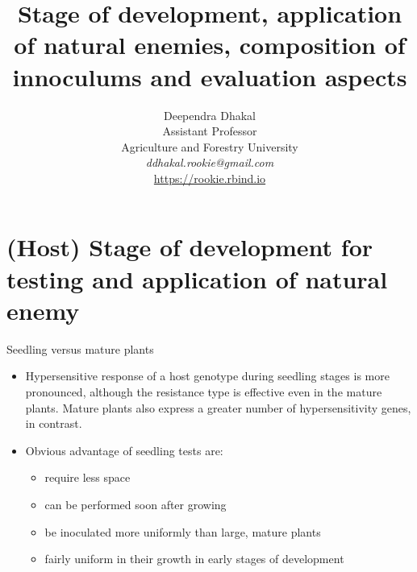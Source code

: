\documentclass[11pt,dvipsnames,ignorenonframetext,aspectratio=169]{beamer}
\title[]{Stage of development, application of natural enemies,
composition of innoculums and evaluation aspects}
\author[
        \vspace{-0.5cm}Deependra Dhakal\\
Assistant Professor\\
Agriculture and Forestry University\\
\textit{ddhakal.rookie@gmail.com}\\
\url{https://rookie.rbind.io}
    ]{\vspace{-0.5cm}Deependra Dhakal\\
Assistant Professor\\
Agriculture and Forestry University\\
\textit{ddhakal.rookie@gmail.com}\\
\url{https://rookie.rbind.io}}
\date[
      
  ]{
    }
\providecommand{\tightlist}{%
  \setlength{\itemsep}{0pt}\setlength{\parskip}{0pt}}
\begin{document}
  \begin{frame}[plain]
  \titlepage
  \end{frame}



\hypertarget{host-stage-of-development-for-testing-and-application-of-natural-enemy}{%
\section{(Host) Stage of development for testing and application of
natural
enemy}\label{host-stage-of-development-for-testing-and-application-of-natural-enemy}}

\begin{frame}{Seedling versus mature plants}
\protect\hypertarget{seedling-versus-mature-plants}{}
\begin{itemize}
\tightlist
\item
  Hypersensitive response of a host genotype during seedling stages is
  more pronounced, although the resistance type is effective even in the
  mature plants. Mature plants also express a greater number of
  hypersensitivity genes, in contrast.
\item
  Obvious advantage of seedling tests are:

  \begin{itemize}
  \tightlist
  \item
    require less space
  \item
    can be performed soon after growing
  \item
    be inoculated more uniformly than large, mature plants
  \item
    fairly uniform in their growth in early stages of development
  \end{itemize}
\end{itemize}
\end{frame}
\end{document}
